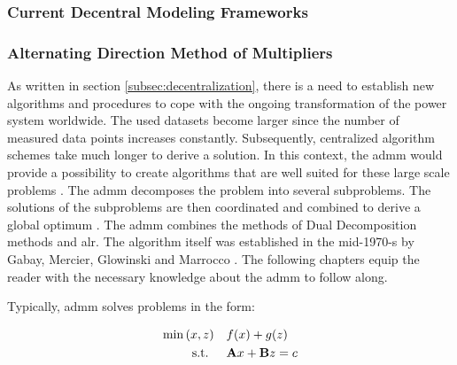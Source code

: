 \subsubsection{Current Decentral Modeling Frameworks}

\subsubsection{Alternating Direction Method of Multipliers}
As written in section \ref{subsec:decentralization}, there is a need to establish new algorithms and procedures to cope with the ongoing transformation of the power system worldwide. The used datasets become larger since the number of measured data points increases constantly. Subsequently, centralized algorithm schemes take much longer to derive a solution. In this context, the \gls{admm} would provide a possibility to create algorithms that are well suited for these large scale problems \citep{boyd2010}. The \gls{admm} decomposes the problem into several subproblems. The solutions of the subproblems are then coordinated and combined to derive a global optimum \citep{boyd2010}. The \gls{admm} combines the methods of Dual Decomposition methods and \gls{alr}. The algorithm itself was established in the mid-1970-s by Gabay, Mercier, Glowinski and Marrocco \citep{boyd2010}. The following chapters equip the reader with the necessary knowledge about the \gls{admm} to follow along.

Typically, \gls{admm} solves problems in the form:

\begin{subequations}
	\begin{align}
		\min{(x, z)} \quad & f(x) + g(z) \\
		\text{s.t. } \quad & \vb{A}x + \vb{B}z = c
	\end{align}
\end{subequations}
